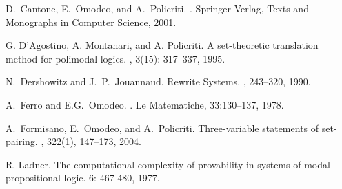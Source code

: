 \documentclass{fundam}
\begin{document}
\begin{thebibliography}{10}
D.~Cantone, E.~Omodeo, and A.~Policriti.
.
\newblock Springer-Verlag, Texts and Monographs in Computer Science, 2001.

G. D'Agostino, A. Montanari, and A. Policriti.
\newblock A set-theoretic translation method for polimodal
logics.
, 3(15): 317--337, 1995.

N.~Dershowitz and J.~P.~Jouannaud.
\newblock Rewrite Systems.
,
    243--320, 1990.

    A.~Ferro and E.G.~Omodeo.
    .
    Le Matematiche, 33:130--137, 1978.

A.~Formisano, E.~Omodeo, and A.~Policriti.
\newblock Three-variable statements of set-pairing.
, 322(1), 147--173, 2004.


R. Ladner.
\newblock The computational complexity of provability in systems of modal propositional logic.
 6: 467-480, 1977.


\end{thebibliography}
\end{document}
